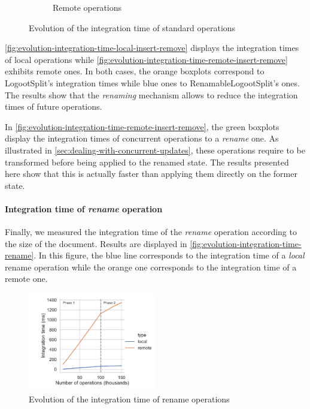 \documentclass[sigplan,10pt]{acmart}
\begin{document}
\begin{figure}
\begin{subfigure}{0.35\textwidth}
        \caption{Remote operations}
        \label{fig:evolution-integration-time-remote-insert-remove}
    \end{subfigure}
    \caption{Evolution of the integration time of standard operations}
    \label{fig:evolution-integration-time-insert-remove}
\end{figure}

\autoref{fig:evolution-integration-time-local-insert-remove} displays the integration times of local operations while \autoref{fig:evolution-integration-time-remote-insert-remove} exhibits remote ones.
In both cases, the orange boxplots correspond to LogootSplit's integration times while blue ones to RenamableLogootSplit's ones.
The results show that the \emph{renaming} mechanism allows to reduce the integration times of future operations.

In \autoref{fig:evolution-integration-time-remote-insert-remove}, the green boxplots display the integration times of concurrent operations to a \emph{rename} one.
As illustrated in \autoref{sec:dealing-with-concurrent-updates}, these operations require to be transformed before being applied to the renamed state.
The results presented here show that this is actually faster than applying them directly on the former state.

\paragraph{Integration time of \emph{rename} operation}

Finally, we measured the integration time of the \emph{rename} operation according to the size of the document.
Results are displayed in \autoref{fig:evolution-integration-time-rename}.
In this figure, the blue line corresponds to the integration time of a \emph{local} rename operation while the orange one corresponds to the integration time of a remote one.

\begin{figure}
    \centering
    \includegraphics[width=0.5\textwidth]{img/integration-time-rename.pdf}
    \caption{Evolution of the integration time of rename operations}
    \label{fig:evolution-integration-time-rename}
\end{figure}
\end{document}
